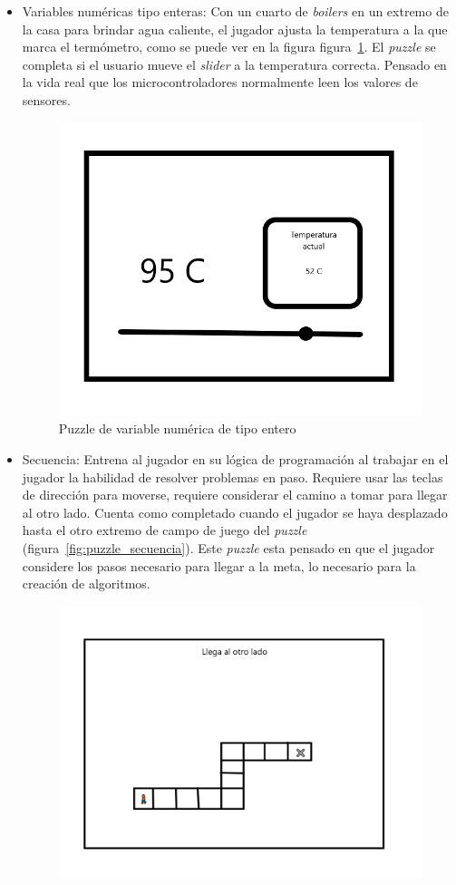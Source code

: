 \begin{itemize}
    \item Variables numéricas tipo enteras: Con un cuarto de \textit{boilers} en un extremo de la casa para brindar agua caliente, el jugador ajusta la temperatura a la que marca el termómetro, como se puede ver en la figura figura~\ref{fig:puzzle_int}. El \textit{puzzle} se completa si el usuario mueve el \textit{slider} a la temperatura correcta. Pensado en la vida real que los microcontroladores normalmente leen los valores de sensores.
    \begin{figure}[H]
        \centering
        \includegraphics[width=0.5\linewidth]{images/PuzzleInt.png}
        \caption{Puzzle de variable numérica de tipo entero }
        \label{fig:puzzle_int}
    \end{figure}
    \item Secuencia: Entrena al jugador en su lógica de programación al trabajar en el jugador la habilidad de resolver problemas en paso. Requiere usar las teclas de dirección para moverse, requiere considerar el camino a tomar para llegar al otro lado. Cuenta como completado cuando el jugador se haya desplazado hasta el otro extremo de campo de juego del \textit{puzzle} (figura~\ref{fig:puzzle_secuencia}). Este \textit{puzzle} esta pensado en que el jugador considere los pasos necesario para llegar a la meta, lo necesario para la creación de algoritmos.
    \begin{figure}[H]
        \centering
        \includegraphics[width=0.5\linewidth]{images/PuzzleSecuencia.png}

\end{figure}
\end{itemize}
